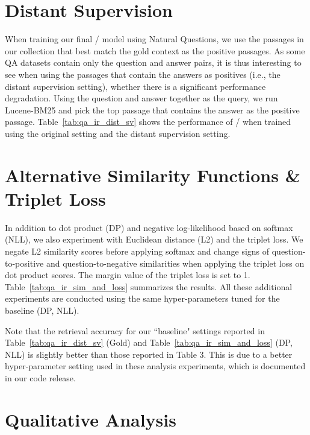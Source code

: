 
\setcounter{table}{4} %

\section{Distant Supervision}
\label{sec:distant}

When training our final \model/ model using Natural Questions, we use the passages in our collection that best match the gold context as the positive passages.
As some QA datasets contain only the question and answer pairs, it is thus interesting to see when using the passages that contain the answers as positives (i.e., the distant supervision setting), whether there is a significant performance degradation.
Using the question and answer together as the query, we run Lucene-BM25 and pick the top passage that contains the answer as the positive passage.
Table~\ref{tab:qa_ir_dist_sv} shows the performance of \model/ when trained using the original setting and the distant supervision setting. 



\section{Alternative Similarity Functions \& Triplet Loss}
\label{sec:alt-sim}
\label{sec:triplet}

In addition to dot product (DP) and negative log-likelihood based on softmax (NLL), we also experiment with Euclidean distance (L2) and the triplet loss.
We negate L2 similarity scores before applying softmax and change signs of question-to-positive and question-to-negative similarities when applying the triplet loss on dot product scores. 
The margin value of the triplet loss is set to 1.
Table~\ref{tab:qa_ir_sim_and_loss} summarizes the results.
All these additional experiments are conducted using the same hyper-parameters tuned for the baseline (DP, NLL).


Note that the retrieval accuracy for our ``baseline" settings reported in Table~\ref{tab:qa_ir_dist_sv} (Gold) and Table~\ref{tab:qa_ir_sim_and_loss} (DP, NLL) is slightly better than those reported in Table 3.
This is due to a better hyper-parameter setting used in these analysis experiments, which is documented in our code release.


\section{Qualitative Analysis}
\label{sec:qual_ana}



